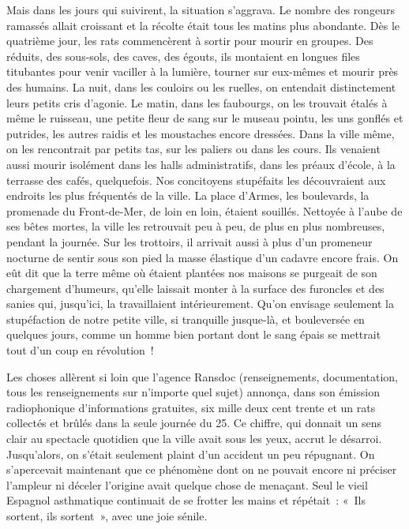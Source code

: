 \documentclass[french,twoside]{book} %
\begin{document}
Mais dans les jours qui suivirent, la situation s’aggrava. Le nombre des rongeurs ramassés allait croissant et la récolte était tous les matins plus abondante. Dès le quatrième jour, les rats commencèrent à sortir pour mourir en groupes. Des réduits, des sous-sols, des caves, des égouts, ils montaient en longues files titubantes pour venir vaciller à la lumière, tourner sur eux-mêmes et mourir près des humains. La nuit, dans les couloirs ou les ruelles, on entendait distinctement leurs petits cris d’agonie. Le matin, dans les faubourgs, on les trouvait étalés à même le ruisseau, une petite fleur de sang sur le museau pointu, les uns gonflés et putrides, les autres raidis et les moustaches encore dressées. Dans la ville même, on les rencontrait par petits tas, sur les paliers ou dans les cours. Ils venaient aussi mourir isolément dans les halls administratifs, dans les préaux d’école, à la terrasse des cafés, quelquefois. Nos concitoyens stupéfaits les découvraient aux endroits les plus fréquentés de la ville. La place d’Armes, les boulevards, la promenade du Front-de-Mer, de loin en loin, étaient souillés. Nettoyée à l’aube de ses bêtes mortes, la ville les retrouvait peu à peu, de plus en plus nombreuses, pendant la journée. Sur les trottoirs, il arrivait aussi à plus d’un promeneur nocturne de sentir sous son pied la masse élastique d’un cadavre encore frais. On eût dit que la terre même où étaient plantées nos maisons se purgeait de son chargement d’humeurs, qu’elle laissait monter à la surface des furoncles et des sanies qui, jusqu’ici, la travaillaient intérieurement. Qu’on envisage seulement la stupéfaction de notre petite ville, si tranquille jusque-là, et bouleversée en quelques jours, comme un homme bien portant dont le sang épais se mettrait tout d’un coup en révolution !\par
Les choses allèrent si loin que l’agence Ransdoc (renseignements, documentation, tous les renseignements sur n’importe quel sujet) annonça, dans son émission radiophonique d’informations gratuites, six mille deux cent trente et un rats collectés et brûlés dans la seule journée du 25. Ce chiffre, qui donnait un sens clair au spectacle quotidien que la ville avait sous les yeux, accrut le désarroi. Jusqu’alors, on s’était seulement plaint d’un accident un peu répugnant. On s’apercevait maintenant que ce phénomène dont on ne pouvait encore ni préciser l’ampleur ni déceler l’origine avait quelque chose de menaçant. Seul le vieil Espagnol asthmatique continuait de se frotter les mains et répétait : « Ils sortent, ils sortent », avec une joie sénile.\par
\end{document}
